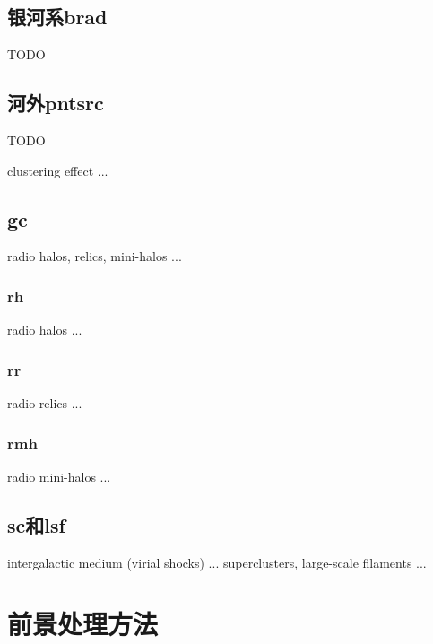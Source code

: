 \subsection{银河系\acl*{brad}}  %

TODO

\subsection{河外\acl*{pntsrc}}  %

TODO

clustering effect ...

\subsection{\acl*{gc}}  %

radio halos, relics, mini-halos ...

\subsubsection{\acl*{rh}}  %

radio halos ...

\subsubsection{\acl*{rr}}  %

radio relics ...

\subsubsection{\acl*{rmh}}  %

radio mini-halos ...

\subsection{\acl*{sc}和\acl*{lsf}}  %

intergalactic medium (virial shocks) ...
superclusters, large-scale filaments ...


\section{前景处理方法}
\label{sec:fg-methods}

